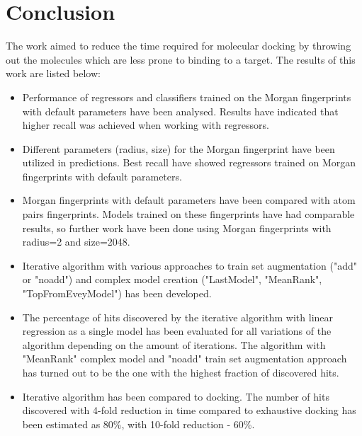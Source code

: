 \chapter{Conclusion}

The work aimed to reduce the time required for molecular docking by throwing out 
the molecules which are less prone to binding to a target. The results of this work 
are listed below:

\begin{itemize}
    \item Performance of regressors and classifiers trained on the Morgan fingerprints with default parameters have been analysed.
    Results have indicated that higher recall was achieved when working with regressors.
    \item Different parameters (radius, size) for the Morgan fingerprint have been utilized in predictions.
    Best recall have showed regressors trained on Morgan fingerprints with default 
parameters.
    \item Morgan fingerprints with default parameters have been compared with atom pairs fingerprints.
    Models trained on these fingerprints have had comparable results, so further 
work have been done using Morgan fingerprints with radius=2 and size=2048.
    \item Iterative algorithm with various approaches to train set augmentation ("add" or "noadd") and complex model creation ("LastModel", "MeanRank", "TopFromEveyModel") has been developed.
    \item The percentage of hits discovered by the iterative algorithm with linear regression as a single model has been evaluated for all variations of the algorithm depending on the amount of iterations.
    The algorithm with "MeanRank" complex model and "noadd" train set augmentation 
approach has turned out to be the one with the highest fraction of discovered hits.
    \item Iterative algorithm has been compared to docking.
    The number of hits discovered with 4-fold reduction in time compared to exhaustive 
docking has been estimated as 80\%, with 10-fold reduction - 60\%.
\end{itemize}
